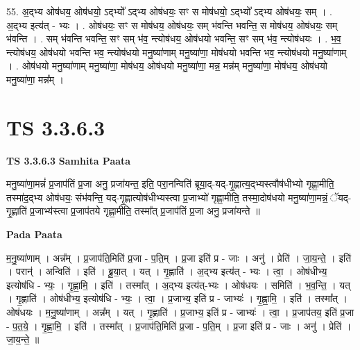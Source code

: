 \documentclass[17pt]{extarticle}
\begin{document}
55. अ॒द्भ्य ओष॑धय॒ ओष॑धयो॒ ऽद्भ्यो᳚ ऽद्भ्य ओष॑धयः॒ सꣳ स मोष॑धयो॒ ऽद्भ्यो᳚ ऽद्भ्य ओष॑धयः॒ सम् । . अ॒द्भ्य इत्य॑त् - भ्यः । . ओष॑धयः॒ सꣳ स मोष॑धय॒ ओष॑धयः॒ सम् भ॑वन्ति भवन्ति॒ स मोष॑धय॒ ओष॑धयः॒ सम् भ॑वन्ति । . सम् भ॑वन्ति भवन्ति॒ सꣳ सम् भ॑व॒ न्त्योष॑धय॒ ओष॑धयो भवन्ति॒ सꣳ सम् भ॑व॒ न्त्योष॑धयः । . भ॒व॒ न्त्योष॑धय॒ ओष॑धयो भवन्ति भव॒ न्त्योष॑धयो मनु॒ष्या॑णाम् मनु॒ष्या॑णा॒ मोष॑धयो भवन्ति भव॒ न्त्योष॑धयो मनु॒ष्या॑णाम् । . ओष॑धयो मनु॒ष्या॑णाम् मनु॒ष्या॑णा॒ मोष॑धय॒ ओष॑धयो मनु॒ष्या॑णा॒ मन्न॒ मन्न॑म् मनु॒ष्या॑णा॒ मोष॑धय॒ ओष॑धयो मनु॒ष्या॑णा॒ मन्न᳚म् । \newline
\pagebreak
{}

\section{ TS 3.3.6.3 }

\textbf{TS 3.3.6.3 } \newline
\textbf{Samhita Paata} \newline

मनु॒ष्या॑णा॒मन्नं॑ प्र॒जाप॑तिं प्र॒जा अनु॒ प्रजा॑यन्त॒ इति॒ परा॒नन्विति॑ ब्रूया॒द्-यद्-गृ॒ह्णात्य॒द्भ्यस्त्वौष॑धीभ्यो गृह्णा॒मीति॒ तस्मा॑द॒द्भ्य ओष॑धयः॒ संभ॑वन्ति॒ यद्-गृ॒ह्णात्योष॑धीभ्यस्त्वा प्र॒जाभ्यो॑ गृह्णा॒मीति॒ तस्मा॒दोष॑धयो मनु॒ष्या॑णा॒मन्नं॒ ॅयद्-गृ॒ह्णाति॑ प्र॒जाभ्य॑स्त्वा प्र॒जाप॑तये गृह्णा॒मीति॒ तस्मा᳚त् प्र॒जाप॑तिं प्र॒जा अनु॒ प्रजा॑यन्ते ॥ \newline

\textbf{Pada Paata} \newline

म॒नु॒ष्या॑णाम् । अन्न᳚म् । प्र॒जाप॑ति॒मिति॑ प्र॒जा - प॒ति॒म् । प्र॒जा इति॑ प्र - जाः । अनु॑ । प्रेति॑ । जा॒य॒न्ते॒ । इति॑ । परान्॑ । अन्विति॑ । इति॑ । ब्रू॒या॒त् । यत् । गृ॒ह्णाति॑ । अ॒द्भ्य इत्य॑त् - भ्यः । त्वा॒ । ओष॑धीभ्य॒ इत्योष॑धि - भ्यः॒ । गृ॒ह्णा॒मि॒ । इति॑ । तस्मा᳚त् । अ॒द्भ्य इत्य॑त्-भ्यः । ओष॑धयः । समिति॑ । भ॒व॒न्ति॒ । यत् । गृ॒ह्णाति॑ । ओष॑धीभ्य॒ इत्योष॑धि - भ्यः॒ । त्वा॒ । प्र॒जाभ्य॒ इति॑ प्र - जाभ्यः॑ । गृ॒ह्णा॒मि॒ । इति॑ । तस्मा᳚त् । ओष॑धयः । म॒नु॒ष्या॑णाम् । अन्न᳚म् । यत् । गृ॒ह्णाति॑ । प्र॒जाभ्य॒ इति॑ प्र - जाभ्यः॑ । त्वा॒ । प्र॒जाप॑तय॒ इति॑ प्र॒जा - प॒त॒ये॒ । गृ॒ह्णा॒मि॒ । इति॑ । तस्मा᳚त् । प्र॒जाप॑ति॒मिति॑ प्र॒जा - प॒ति॒म् । प्र॒जा इति॑ प्र - जाः । अनु॑ । प्रेति॑ । जा॒य॒न्ते॒ ॥  \newline
\end{document}
